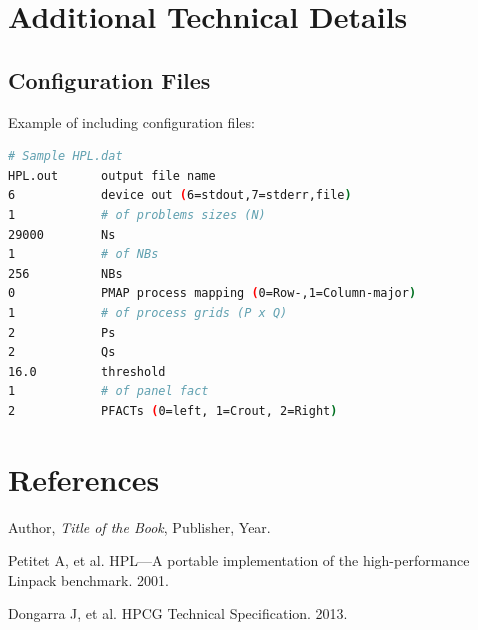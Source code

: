 \documentclass[a4paper,12pt]{article}
\begin{document}
\newpage

\appendix
\section{Additional Technical Details}
\subsection{Configuration Files}
Example of including configuration files:

\begin{lstlisting}[language=bash, caption=HPL Configuration File]
# Sample HPL.dat
HPL.out      output file name
6            device out (6=stdout,7=stderr,file)
1            # of problems sizes (N)
29000        Ns
1            # of NBs
256          NBs
0            PMAP process mapping (0=Row-,1=Column-major)
1            # of process grids (P x Q)
2            Ps
2            Qs
16.0         threshold
1            # of panel fact
2            PFACTs (0=left, 1=Crout, 2=Right)
\end{lstlisting}

\newpage

\section{References}
\begin{thebibliography}{9}
Author, \textit{Title of the Book}, Publisher, Year.

Petitet A, et al. HPL—A portable implementation of the high-performance Linpack benchmark. 2001.

Dongarra J, et al. HPCG Technical Specification. 2013.
\end{thebibliography}

\newpage
\end{document}
